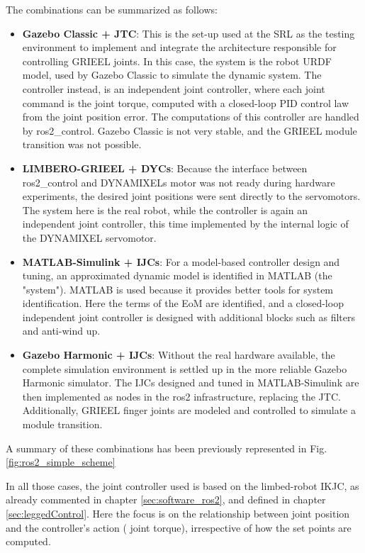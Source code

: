 The combinations can be summarized as follows: 
\begin{itemize}
    \setlength\itemsep{-0.7em} 
    \item \textbf{Gazebo Classic + JTC}: This is the set-up used at the SRL as the testing environment to implement and integrate the architecture responsible for controlling GRIEEL joints. In this case, the system is the robot URDF model, used by Gazebo Classic to simulate the dynamic system. The controller instead, is an independent joint controller, where each joint command is the joint torque, computed with a closed-loop PID control law from the joint position error. The computations of this controller are handled by ros2\_control.
    Gazebo Classic is not very stable, and the GRIEEL module transition was not possible. 
    
    \item \textbf{LIMBERO-GRIEEL + DYCs}: 
    Because the interface between ros2\_control and DYNAMIXELs motor was not ready during hardware experiments, the desired joint positions were sent directly to the servomotors. The system here is the real robot, while the controller is again an independent joint controller, this time implemented by the internal logic of the DYNAMIXEL servomotor.  

    \item \textbf{MATLAB-Simulink + IJCs}:
    For a model-based controller design and tuning, an approximated dynamic model is identified in MATLAB (the "system"). MATLAB is used because it provides better tools for system identification. Here the terms of the EoM are identified, and a closed-loop independent joint controller is designed with additional blocks such as filters and anti-wind up. 
    
    \item \textbf{Gazebo Harmonic + IJCs}:
    Without the real hardware available, the complete simulation environment is settled up in the more reliable Gazebo Harmonic simulator. The IJCs designed and tuned in MATLAB-Simulink are then implemented as nodes in the ros2 infrastructure, replacing the JTC. Additionally, GRIEEL finger joints are modeled and controlled to simulate a module transition.  
\end{itemize}
A summary of these combinations has been previously represented in Fig.\ref{fig:ros2_simple_scheme}

In all those cases, the joint controller used is based on the limbed-robot IKJC, as already commented in chapter \ref{sec:software_ros2}, and defined in chapter \ref{sec:leggedControl}.
Here the focus is on the relationship between joint position and the controller's action ( joint torque), irrespective of how the set points are computed. 

